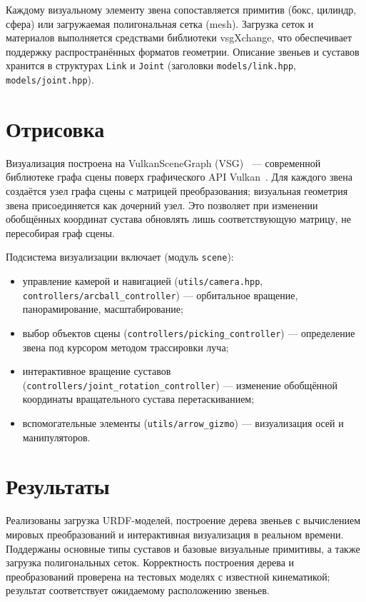 Каждому визуальному элементу звена сопоставляется примитив (бокс, цилиндр, сфера)
или загружаемая полигональная сетка (mesh). Загрузка сеток и материалов
выполняется средствами библиотеки vsgXchange, что обеспечивает поддержку
распространённых форматов геометрии. Описание звеньев и суставов хранится в
структурах \texttt{Link} и \texttt{Joint} (заголовки \texttt{models/link.hpp},
\texttt{models/joint.hpp}).

\section{Отрисовка}

Визуализация построена на VulkanSceneGraph (VSG)~\cite{vsg} --- современной
библиотеке графа сцены поверх графического API Vulkan~\cite{vulkan}. Для каждого звена создаётся узел графа
сцены с матрицей преобразования; визуальная геометрия звена присоединяется как
дочерний узел. Это позволяет при изменении обобщённых координат сустава
обновлять лишь соответствующую матрицу, не пересобирая граф сцены.

Подсистема визуализации включает (модуль \texttt{scene}):
\begin{itemize}
  \item управление камерой и навигацией (\texttt{utils/camera.hpp},
        \texttt{controllers/arcball\_controller}) --- орбитальное вращение,
        панорамирование, масштабирование;
  \item выбор объектов сцены (\texttt{controllers/picking\_controller}) ---
        определение звена под курсором методом трассировки луча;
  \item интерактивное вращение суставов
        (\texttt{controllers/\allowbreak joint\_rotation\_controller}) --- изменение
        обобщённой координаты вращательного сустава перетаскиванием;
  \item вспомогательные элементы (\texttt{utils/arrow\_gizmo}) --- визуализация
        осей и манипуляторов.
\end{itemize}


\section{Результаты}

Реализованы загрузка URDF-моделей, построение дерева звеньев с вычислением
мировых преобразований и интерактивная визуализация в реальном времени.
Поддержаны основные типы суставов и базовые визуальные примитивы, а также
загрузка полигональных сеток. Корректность построения дерева и преобразований
проверена на тестовых моделях с известной кинематикой; результат соответствует
ожидаемому расположению звеньев.
